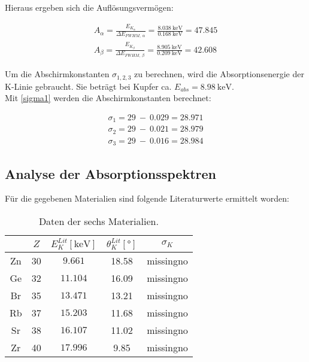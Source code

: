 Hieraus ergeben sich die Auflösungsvermögen:

\begin{align*}
  A_{\alpha} = \frac{E_{K_{\alpha}}}{\Delta E_{FWHM,\ \alpha}} = \frac{\SI{8.038}{\kilo\electronvolt}}{\SI{0.168}{\kilo\electronvolt}} = 47.845\\
  A_{\beta} = \frac{E_{K_{\beta}}}{\Delta E_{FWHM,\ \beta}} = \frac{\SI{8.905}{\kilo\electronvolt}}{\SI{0.209}{\kilo\electronvolt}} = 42.608
\end{align*}

Um die Abschirmkonstanten $\sigma_{1,2,3}$ zu berechnen, wird die Absorptionsenergie der K-Linie gebraucht.
Sie beträgt bei Kupfer ca. $E_{abs} = \SI{8.98}{\kilo\electronvolt}$\cite{nist}.\\
Mit \autoref{sigma1} werden die Abschirmkonstanten berechnet:

\begin{align*}
  \sigma_1 = 29\ -\ 0.029 = 28.971\\
  \sigma_2 = 29\ -\ 0.021 = 28.979\\
  \sigma_3 = 29\ -\ 0.016 = 28.984
\end{align*}
\newpage
\subsection{Analyse der Absorptionsspektren}
Für die gegebenen Materialien sind folgende Literaturwerte ermittelt worden\cite{nist}:

\begin{table}
  \centering
  \caption{Daten der sechs Materialien\cite{nist}.}
  \begin{tabular}{c c c c c}
    \toprule
    $ $ & $Z$ & $E_K^{Lit}[\si{\kilo\electronvolt}]$ & $\theta_K^{Lit}[\si{\degree}]$ & $\sigma_K$\\
    \midrule
    Zn & 30 & $9.661$ & 18.58 & missingno\\ \hline
    Ge & 32 & $11.104$ & 16.09 & missingno\\ \hline
    Br & 35 & $13.471$ & 13.21 & missingno\\ \hline
    Rb & 37 & $15.203$ & 11.68 & missingno\\ \hline
    Sr & 38 & $16.107$ & 11.02 & missingno\\ \hline
    Zr & 40 & $17.996$ & 9.85 & missingno\\
    \bottomrule
  \end{tabular}
  \label{tab:litdata}
\end{table}

